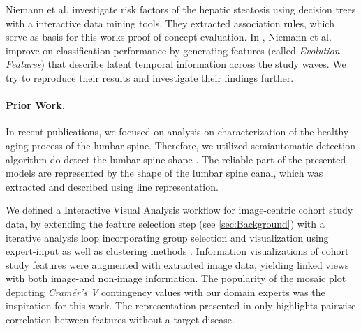 \documentclass[journal]{style/vgtc} 			          %
\newcommand{\com}[1]{\textcolor{orange}{\uline{#1}}}
\begin{document}
Niemann et al. \cite{Niemann2014} investigate risk factors of the hepatic steatosis using decision trees with a interactive data mining tools.
They extracted association rules, which serve as basis for this works proof-of-concept evaluation.
In \cite{Niemann2015}, Niemann et al. improve on classification performance by generating features (called \emph{Evolution Features}) that describe latent temporal information across the study waves.
We try to reproduce their results and investigate their findings further.

\paragraph{Prior Work.}
In recent publications, we focused on analysis on characterization of the healthy aging process of the lumbar spine.
Therefore, we utilized semiautomatic detection algorithm do detect the lumbar spine shape \cite{Klemm2013VMV}.
The reliable part of the presented models are represented by the shape of the lumbar spine canal, which was extracted and described using line representation.

We defined a Interactive Visual Analysis workflow for image-centric cohort study data, by extending the feature selection step (see \ref{sec:Background}) with a iterative analysis loop incorporating group selection and visualization using expert-input as well as clustering methods \cite{Klemm2014VIS}.
Information visualizations of cohort study features were augmented with extracted image data, yielding linked views with both image-and non-image information.
The popularity of the mosaic plot depicting \emph{Cram\'{e}r's V} contingency values with our domain experts was the inspiration for this work.
The representation presented in \cite{Klemm2014VIS} only highlights pairwise correlation between features without a target disease.
\end{document}

